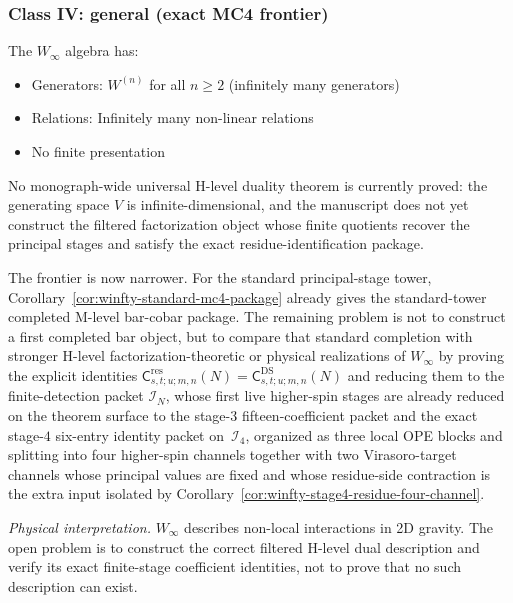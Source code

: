 \subsubsection{Class IV: general (exact MC4 frontier)}

\begin{example}\label{ex:winfty-completion-frontier-comprehensive}
The $W_\infty$ algebra has:
\begin{itemize}
\item Generators: $W^{(n)}$ for all $n \geq 2$ (infinitely many generators)
\item Relations: Infinitely many non-linear relations
\item No finite presentation
\end{itemize}

No monograph-wide universal H-level duality theorem is currently
proved: the generating space $V$ is infinite-dimensional, and the
manuscript does not yet construct the filtered factorization object
whose finite quotients recover the principal stages and satisfy the
exact residue-identification package.

The frontier is now narrower.  For the standard principal-stage tower,
Corollary~\ref{cor:winfty-standard-mc4-package} already gives the
standard-tower completed M-level bar-cobar package.  The remaining
problem is not to construct a first completed bar object, but to
compare that standard completion with stronger H-level
factorization-theoretic or physical realizations of $W_\infty$ by
proving the explicit identities
$\mathsf{C}^{\mathrm{res}}_{s,t;u;m,n}(N)
=\mathsf{C}^{\mathrm{DS}}_{s,t;u;m,n}(N)$
and reducing them to the finite-detection packet $\mathcal{I}_N$, whose
first live higher-spin stages are already reduced on the theorem
surface to the stage-$3$ fifteen-coefficient packet and the exact
stage-$4$ six-entry identity packet on~$\mathcal{I}_4$, organized as
three local OPE blocks and splitting into four higher-spin channels
together with two Virasoro-target channels whose principal values are
fixed and whose residue-side contraction is the extra input isolated by
Corollary~\ref{cor:winfty-stage4-residue-four-channel}.

\emph{Physical interpretation.}
$W_\infty$ describes non-local interactions in 2D gravity.  The open problem is
to construct the correct filtered H-level dual description and verify
its exact finite-stage coefficient identities, not to prove that no such
description can exist.
\end{example}

